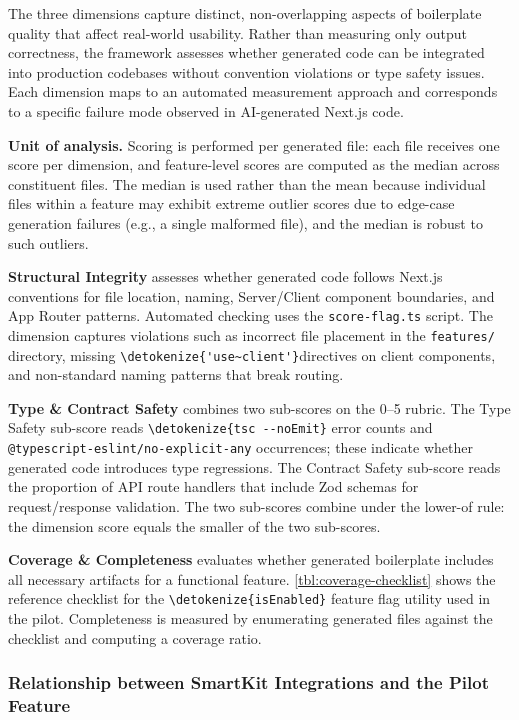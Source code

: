 \documentclass[12pt,a4paper]{report}
\newcommand{\code}[1]{\texttt{\nolinkurl{\detokenize{#1}}}}
\newcommand{\pkg}[1]{\texttt{\nolinkurl{#1}}}
\DeclareRobustCommand{\filename}[1]{\bgroup\urlstyle{tt}\nolinkurl{#1}\egroup}
\newcommand{\usec}{\code{'use~client'}}
\begin{document}
The three dimensions capture distinct, non-overlapping aspects of boilerplate quality that affect real-world usability. Rather than measuring only output correctness, the framework assesses whether generated code can be integrated into production codebases without convention violations or type safety issues. Each dimension maps to an automated measurement approach and corresponds to a specific failure mode observed in AI-generated Next.js code.

\textbf{Unit of analysis.} Scoring is performed per generated file: each file receives one score per dimension, and feature-level scores are computed as the median across constituent files. The median is used rather than the mean because individual files within a feature may exhibit extreme outlier scores due to edge-case generation failures (e.g., a single malformed file), and the median is robust to such outliers.

\textbf{Structural Integrity} assesses whether generated code follows Next.js conventions for file location, naming, Server/Client component boundaries, and App Router patterns. Automated checking uses the \filename{score-flag.ts} script. The dimension captures violations such as incorrect file placement in the \filename{features/} directory, missing \usec directives on client components, and non-standard naming patterns that break routing.

\textbf{Type \& Contract Safety} combines two sub-scores on the 0--5 rubric. The Type Safety sub-score reads \code{tsc --noEmit} error counts and \pkg{@typescript-eslint/}\pkg{no-explicit-any} occurrences; these indicate whether generated code introduces type regressions. The Contract Safety sub-score reads the proportion of API route handlers that include Zod schemas for request/response validation. The two sub-scores combine under the lower-of rule: the dimension score equals the smaller of the two sub-scores.

\textbf{Coverage \& Completeness} evaluates whether generated boilerplate includes all necessary artifacts for a functional feature. \autoref{tbl:coverage-checklist} shows the reference checklist for the \code{isEnabled} feature flag utility used in the pilot. Completeness is measured by enumerating generated files against the checklist and computing a coverage ratio.

\subsubsection{Relationship between SmartKit Integrations and the Pilot Feature}
\label{sec:integrations-and-pilot}
\end{document}
